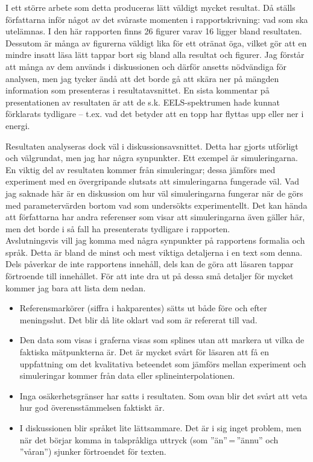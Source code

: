 \documentclass[11pt,a4paper, english, swedish
]{article}
\begin{document}
I ett större arbete som detta produceras lätt väldigt mycket resultat. Då ställs författarna inför något av det svåraste momenten i rapportskrivning: vad som ska utelämnas. I den här rapporten finns 26 figurer varav 16 ligger bland resultaten. Dessutom är många av figurerna väldigt lika för ett otränat öga, vilket gör att en mindre insatt läsa lätt tappar bort sig bland alla resultat och figurer. Jag förstår att många av dem används i diskussionen och därför ansetts nödvändiga för analysen, men jag tycker ändå att det borde gå att skära ner på mängden information som presenteras i resultatavsnittet. 
En sista kommentar på presentationen av resultaten är att de s.k. EELS-spektrumen hade kunnat förklarats tydligare -- t.ex. vad det betyder att en topp har flyttas upp eller ner i energi. 

Resultaten analyseras dock väl i diskussionsavsnittet. Detta har gjorts utförligt och välgrundat, men jag har några synpunkter. Ett exempel är simuleringarna. En viktig del av resultaten kommer från simuleringar; dessa jämförs med experiment med en övergripande slutsats att simuleringarna fungerade väl. Vad jag saknade här är en diskussion om hur väl simuleringarna fungerar när de görs med parametervärden bortom vad som undersökts experimentellt. 
Det kan hända att författarna har andra referenser som visar att simuleringarna även gäller här, men det borde i så fall ha presenterats tydligare i rapporten. 
\\[2cm]

\noindent
Avslutningsvis vill jag komma med några synpunkter på rapportens formalia och språk. Detta är bland de minst och mest viktiga detaljerna i en text som denna. Dels påverkar de inte rapportens innehåll, dels kan de göra att läsaren tappar förtroende till innehållet. För att inte dra ut på dessa små detaljer för mycket kommer jag bara att lista dem nedan.

\begin{itemize}
\item Referensmarkörer (siffra i hakparentes) sätts ut både före och efter meningsslut. Det blir då lite oklart vad som är refererat till vad.
\item Den data som visas i graferna visas som splines utan att markera ut vilka de faktiska mätpunkterna är. Det är mycket svårt för läsaren att få en uppfattning om det kvalitativa beteendet som jämförs mellan experiment och simuleringar kommer från data eller splineinterpolationen.
\item Inga osäkerhetsgränser har satts i resultaten. Som ovan blir det svårt att veta hur god överensstämmelsen faktiskt är.
\item I diskussionen blir språket lite lättsammare. Det är i sig inget problem, men när det börjar komma in talspråkliga uttryck (som ''än''\,=\,''ännu'' och ''våran'') sjunker förtroendet för texten.
\end{itemize}





\end{document}
